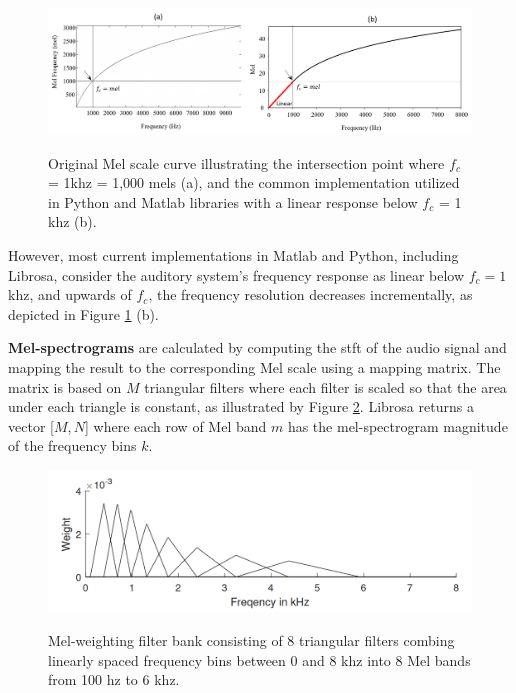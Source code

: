 \begin{figure}[htbp]
    \raggedright
        \caption{Original Mel scale curve illustrating the intersection point where $f_c$ = 1\gls{k}\gls{hz} = 1,000 mels (a), and the common implementation utilized in Python and Matlab libraries with a linear response below $f_c$ = 1 \gls{k}\gls{hz} (b).}
        \includegraphics[width=1\textwidth]{resources/images/030-theoretical_framework/Framework_spectral_features_log-mel_scale.png}
        \label{fig:frmwk_spectral_features_mel_scale}
\end{figure}

However, most current implementations in Matlab and Python, including Librosa, consider the auditory system’s frequency response as linear below $f_c = 1$ \gls{k}\gls{hz}, and upwards of $f_c$, the frequency resolution decreases incrementally, as depicted in Figure \ref{fig:frmwk_spectral_features_mel_scale} (b). 

\textbf{Mel-spectrograms} are calculated by computing the \gls{stft} of the audio signal and mapping the result to the corresponding Mel scale using a mapping matrix. The matrix is based on $M$ triangular filters where each filter is scaled so that the area under each triangle is constant, as illustrated by Figure \ref{fig:frmwk_spectral_features_mel_filter_bank}. Librosa \cite{McFee2015librosa_sw} returns a vector [$M, N$] where each row of Mel band $m$ has the mel-spectrogram magnitude of the frequency bins $k$.

\begin{figure}[htbp]
    \raggedright
        \caption{Mel-weighting filter bank consisting of 8 triangular filters combing linearly spaced frequency bins between 0 and 8 \gls{k}\gls{hz} into 8 Mel bands from 100 \gls{hz} to 6 \gls{k}\gls{hz}.}
        \includegraphics[width=.75\textwidth]{resources/images/030-theoretical_framework/Framework_spectral_features_log-mel_filter_bank.png}
        \label{fig:frmwk_spectral_features_mel_filter_bank}
\end{figure}

